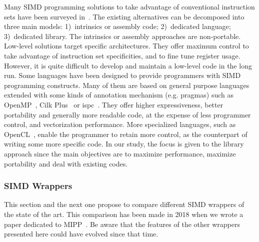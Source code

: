 Many SIMD programming solutions to take advantage of conventional instruction
sets have been surveyed in~\cite{Pohl2016}. The existing alternatives can be
decomposed into three main models: 1)~intrinsics or assembly code; 2)~dedicated
language; 3)~dedicated library. The intrinsics or assembly approaches are
non-portable. Low-level solutions target specific architectures. They offer
maximum control to take advantage of instruction set specificities, and to fine
tune register usage. However, it is quite difficult to develop and maintain a
low-level code in the long run. Some languages have been designed to provide
programmers with SIMD programming constructs. Many of them are based on general
purpose languages extended with some kinds of annotation mechanism (e.g.
pragmas) such as OpenMP~\cite{OpenMP2013}, Cilk Plus~\cite{Robison2013} or
ispc~\cite{Pharr2012}. They offer higher expressiveness, better portability and
generally more readable code, at the expense of less programmer control, and
vectorization performance. More specialized languages, such as
OpenCL~\cite{Howes2015}, enable the programmer to retain more control, as the
counterpart of writing some more specific code. In our study, the focus is given
to the library approach since the main objectives are to maximize performance,
maximize portability and deal with existing \Cxx codes.

\subsubsection{\Cxx SIMD Wrappers}

This section and the next one propose to compare different SIMD wrappers of the
state of the art. This comparison has been made in 2018 when we wrote a paper
dedicated to MIPP~\cite{Cassagne2018}. Be aware that the features of the other
wrappers presented here could have evolved since that time.


